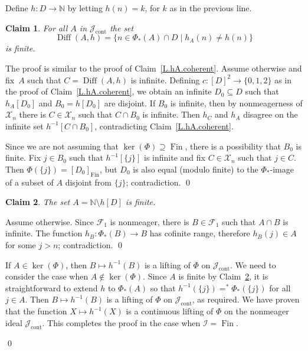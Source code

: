\documentclass{amsart}
\makeatletter
\def\Fin{{\rm Fin}}   %
\newtheorem{claim}{Claim}
\theoremstyle{definition}
\theoremstyle{remark}
\def\Fin{\operatorname{Fin}}
\DeclareMathOperator{\Ccont}{cont}
\newcommand{\Jcont}{\cJ_{\Ccont}}
\renewcommand{\proofname}{Proof}
\renewenvironment{proof}[1][\proofname]{\par
\let\oldqedsymbol\qedsymbol             %
  \normalfont
  \topsep6\p@\@plus6\p@ \trivlist
  \item[\hskip\labelsep\hskip\parindent\scshape
    #1\@addpunct{.}]\ignorespaces
}{%
  \qed\endtrivlist
\global\let\qedsymbol\oldqedsymbol      %
}
\newcommand{\bbN}{\mathbb N}
\newcommand{\cI}{{\mathcal I}} %
\newcommand{\cJ}{{\mathcal J}} %
\newcommand{\cX}{\mathcal X}
\newcommand{\cF}{\mathcal F}
\DeclareMathOperator{\Diff}{Diff}
\numberwithin{claim}{subsection}
\makeatother
\begin{document}
\begin{proof}[Proof of Theorem~\ref{T.OCAsharp-Fin}]
	Define $h\colon D\to \bbN$ by letting $h(n)=k$,  for $k$ as in the previous line. 
	
		\begin{claim}\label{L.hA.coherent.plus}
		For all $A$ in $\Jcont$ the set 
		\[
		\Diff(A,h)=\{n\in \Phi_*(A)\cap D\mid h_A(n)\neq h(n)\}
		\]
		is finite. 
	\end{claim}
	
	
	\begin{proof}  The proof is similar to the proof of Claim~\ref{L.hA.coherent}. Assume otherwise and fix~$A$ such that $C=\Diff(A,h)$ is infinite. Defining $c\colon [D]^2\to \{0,1,2\}$ as in the proof of Claim~\ref{L.hA.coherent}, we obtain an infinite $D_0\subseteq D$ such that $h_A[D_0]$ and $B_0=h[D_0]$ are disjoint. If $B_0$ is  infinite, then by nonmeagerness of $\cX_n$ there is $C\in \cX_n$ such that $C\cap B_0$ is  infinite.  Then $h_{C} $ and $h_A$ disagree on the infinite set $h^{-1}[C\cap B_0]$, contradicting Claim~\ref{L.hA.coherent}. 
		
		Since we are not assuming that $\ker(\Phi)\supseteq \Fin$, there is a possibility that $B_0$ is finite. Fix $j\in B_0$ such that $h^{-1}[\{j\}]$ is infinite and fix $C\in \cX_n$ such that $j\in C$. Then $\Phi(\{j\})=[D_0]_{\Fin}$, but $D_0$ is also equal (modulo finite) to the $\Phi_*$-image of a subset of $A$ disjoint from $\{j\}$; contradiction. 
	\end{proof}
	
	
	\begin{claim}\label{C.AisFinite} The set $A=\bbN\setminus h[D]$ is finite. 
	\end{claim}
	\begin{proof}
		Assume otherwise. Since $\cF_1$ is nonmeager, there is $B\in \cF_1$ such that $A\cap B$ is infinite. The function $h_B\colon \Phi_*(B)\to B$ has cofinite range, therefore $h_B(j)\in A$ for some $j>n$; contradiction. 
	\end{proof}
	
	If $A\in \ker(\Phi)$, then  $B\mapsto h^{-1}(B)$ is a lifting of $\Phi$ on $\Jcont$. We need to consider the case when $A\notin \ker(\Phi)$.  Since $A$ is finite by Claim~\ref{C.AisFinite}, it is straightforward to extend $h$ to  $\Phi_*(A)$ so that $h^{-1}(\{j\})=^*\Phi_*(\{j\})$ for all $j\in A$. Then $B\mapsto h^{-1}(B)$ is a lifting of $\Phi$ on $\Jcont$, as required. 
	We have proven that the function $X\mapsto h^{-1}(X)$ is a continuous lifting of $\Phi$ on the nonmeager ideal $\Jcont$. This completes the proof in the case when $\cI=\Fin$. 
	

\end{proof}
\end{document}
